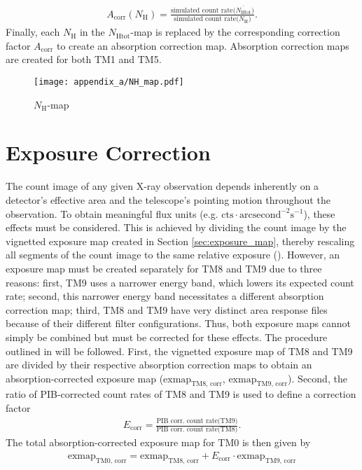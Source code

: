 \begin{align*}
    A_{\text{corr}}(N_\text{H}) = \frac{\text{simulated count rate}\bigl(\overline{N_{\text{Htot}}}\bigr)}{\text{simulated count rate}\bigl(N_\text{H}\bigr)}.
\end{align*}
Finally, each \(\textstyle{N_\text{H}}\) in the \({\textstyle N_\text{Htot}}\)-map is replaced by the corresponding correction factor \(A_\text{corr}\) to create an absorption correction map. Absorption correction maps are created for both TM1 and TM5.
%
\begin{figure}[htbp]
    \centering
    \texttt{[image: appendix\_a/NH\_map.pdf]}
    \caption{\(N_{\text{H}}\)-map}
    \label{fig:pib_map}
\end{figure}
%
\section{Exposure Correction}\label{sec:exposure}
The count image of any given X-ray observation depends inherently on a detector's effective area and the telescope's pointing motion throughout the observation. To obtain meaningful flux units (e.g. \(\text{cts}\cdot\text{arcsecond}^{-2}\text{s}^{-1}\)), these effects must be considered. This is achieved by dividing the count image by the vignetted exposure map created in Section \ref{sec:exposure_map}, thereby rescaling all segments of the count image to the same relative exposure (\cite{davis2001formal}). However, an exposure map must be created separately for TM8 and TM9 due to three reasons: first, TM9 uses a narrower energy band, which lowers its expected count rate; second, this narrower energy band necessitates a different absorption correction map; third, TM8 and TM9 have very distinct area response files because of their different filter configurations. Thus, both exposure maps cannot simply be combined but must be corrected for these effects. The procedure outlined in \citep{Reiprich2021} will be followed. First, the vignetted exposure map of TM8 and TM9 are divided by their respective absorption correction maps to obtain an absorption-corrected exposure map (\(\text{exmap}_\text{TM8, corr}\), \(\text{exmap}_\text{TM9, corr}\)). Second, the ratio of PIB-corrected count rates of TM8 and TM9 is used to define a correction factor 
\begin{align*}
    E_\text{corr} = \frac{\text{PIB corr. count rate(TM9)}}{\text{PIB corr. count rate(TM8)}}.
\end{align*}
The total absorption-corrected exposure map for TM0 is then given by
\begin{align*}
    \text{exmap}_\text{TM0, corr} = \text{exmap}_\text{TM8, corr} + E_\text{corr}\cdot\text{exmap}_\text{TM9, corr} 
\end{align*}
